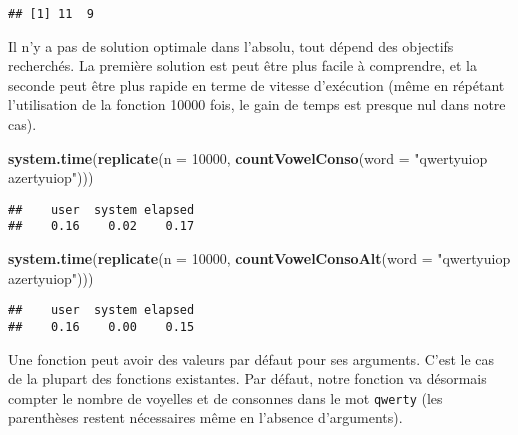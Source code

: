 \documentclass[]{book}
\newenvironment{Shaded}{\begin{snugshade}}{\end{snugshade}}
\newcommand{\KeywordTok}[1]{\textcolor[rgb]{0.13,0.29,0.53}{\textbf{#1}}}
\newcommand{\DataTypeTok}[1]{\textcolor[rgb]{0.13,0.29,0.53}{#1}}
\newcommand{\DecValTok}[1]{\textcolor[rgb]{0.00,0.00,0.81}{#1}}
\newcommand{\StringTok}[1]{\textcolor[rgb]{0.31,0.60,0.02}{#1}}
\newcommand{\NormalTok}[1]{#1}
\theoremstyle{definition}
\theoremstyle{definition}
\theoremstyle{definition}
\theoremstyle{remark}
\begin{document}
\begin{verbatim}
## [1] 11  9
\end{verbatim}

Il n'y a pas de solution optimale dans l'absolu, tout dépend des
objectifs recherchés. La première solution est peut être plus facile à
comprendre, et la seconde peut être plus rapide en terme de vitesse
d'exécution (même en répétant l'utilisation de la fonction 10000 fois,
le gain de temps est presque nul dans notre cas).

\begin{Shaded}
\begin{Highlighting}[]
\KeywordTok{system.time}\NormalTok{(}\KeywordTok{replicate}\NormalTok{(}\DataTypeTok{n =} \DecValTok{10000}\NormalTok{, }\KeywordTok{countVowelConso}\NormalTok{(}\DataTypeTok{word =} \StringTok{"qwertyuiop azertyuiop"}\NormalTok{)))}
\end{Highlighting}
\end{Shaded}

\begin{verbatim}
##    user  system elapsed 
##    0.16    0.02    0.17
\end{verbatim}

\begin{Shaded}
\begin{Highlighting}[]
\KeywordTok{system.time}\NormalTok{(}\KeywordTok{replicate}\NormalTok{(}\DataTypeTok{n =} \DecValTok{10000}\NormalTok{, }\KeywordTok{countVowelConsoAlt}\NormalTok{(}\DataTypeTok{word =} \StringTok{"qwertyuiop azertyuiop"}\NormalTok{)))}
\end{Highlighting}
\end{Shaded}

\begin{verbatim}
##    user  system elapsed 
##    0.16    0.00    0.15
\end{verbatim}

Une fonction peut avoir des valeurs par défaut pour ses arguments. C'est
le cas de la plupart des fonctions existantes. Par défaut, notre
fonction va désormais compter le nombre de voyelles et de consonnes dans
le mot \texttt{qwerty} (les parenthèses restent nécessaires même en
l'absence d'arguments).
\end{document}
